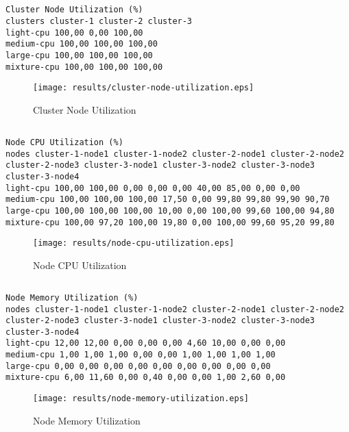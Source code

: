 \documentclass{elsart}
\begin{document}
\subsection{}

\begin{lstlisting}[caption={Cluster Node Utilization}]
Cluster Node Utilization (%)
clusters cluster-1 cluster-2 cluster-3
light-cpu 100,00 0,00 100,00
medium-cpu 100,00 100,00 100,00
large-cpu 100,00 100,00 100,00
mixture-cpu 100,00 100,00 100,00
\end{lstlisting}

\begin{figure}[ht]
\centering
\texttt{[image: results/cluster-node-utilization.eps]}
\caption{Cluster Node Utilization}\label{fig:cluster-node-utilization.eps}
\end{figure}

\subsection{}

\begin{lstlisting}[caption={Node CPU Utilization}]
Node CPU Utilization (%)
nodes cluster-1-node1 cluster-1-node2 cluster-2-node1 cluster-2-node2 cluster-2-node3 cluster-3-node1 cluster-3-node2 cluster-3-node3 cluster-3-node4
light-cpu 100,00 100,00 0,00 0,00 0,00 40,00 85,00 0,00 0,00
medium-cpu 100,00 100,00 100,00 17,50 0,00 99,80 99,80 99,90 90,70
large-cpu 100,00 100,00 100,00 10,00 0,00 100,00 99,60 100,00 94,80
mixture-cpu 100,00 97,20 100,00 19,80 0,00 100,00 99,60 95,20 99,80
\end{lstlisting}

\begin{figure}[ht]
\centering
\texttt{[image: results/node-cpu-utilization.eps]}
\caption{Node CPU Utilization}\label{fig:node-cpu-utilization.eps}
\end{figure}

\subsection{}

\begin{lstlisting}[caption={Node Memory Utilization}]
Node Memory Utilization (%)
nodes cluster-1-node1 cluster-1-node2 cluster-2-node1 cluster-2-node2 cluster-2-node3 cluster-3-node1 cluster-3-node2 cluster-3-node3 cluster-3-node4
light-cpu 12,00 12,00 0,00 0,00 0,00 4,60 10,00 0,00 0,00
medium-cpu 1,00 1,00 1,00 0,00 0,00 1,00 1,00 1,00 1,00
large-cpu 0,00 0,00 0,00 0,00 0,00 0,00 0,00 0,00 0,00
mixture-cpu 6,00 11,60 0,00 0,40 0,00 0,00 1,00 2,60 0,00
\end{lstlisting}

\begin{figure}[ht]
\centering
\texttt{[image: results/node-memory-utilization.eps]}
\caption{Node Memory Utilization}\label{fig:node-memory-utilization.eps}
\end{figure}
\end{document}
